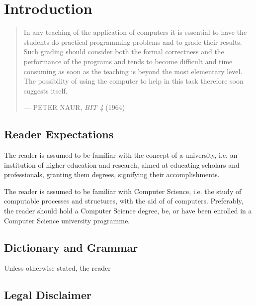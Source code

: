 
\chapter{Introduction}

\begin{quotation}

\footnotesize\sffamily\itshape

\begin{flushright}

In any teaching of the application of computers it is essential to have the
students do practical programming problems and to grade their results. Such
grading should consider both the formal correctness and the performance of the
programs and tends to become difficult and time consuming as soon as the
teaching is beyond the most elementary level.  The possibility of using the
computer to help in this task therefore soon suggests itself.

\smallbreak

\upshape

--- PETER NAUR, {\itshape BIT 4} (1964)

\end{flushright}

\end{quotation}

\section{Reader Expectations}

The reader is assumed to be familiar with the concept of a university, i.e. an
institution of higher education and research, aimed at educating scholars and
professionals, granting them degrees, signifying their accomplishments.

The reader is assumed to be familiar with Computer Science, i.e. the study of
computable processes and structures, with the aid of of computers. Preferably,
the reader should hold a Computer Science degree, be, or have been enrolled in
a Computer Science university programme.

\section{Dictionary and Grammar}

Unless otherwise stated, the reader

\section{Legal Disclaimer}

